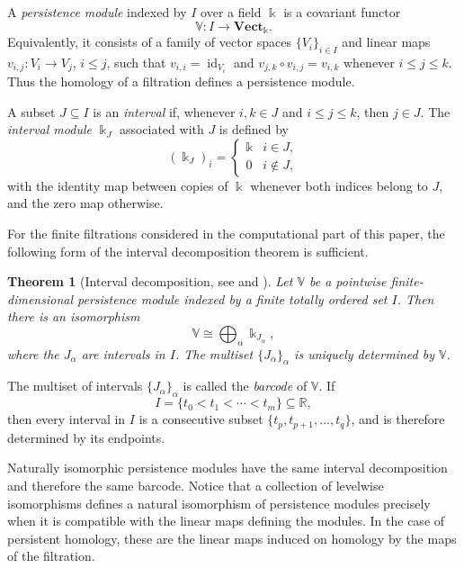 \documentclass[a4paper,11pt]{article}
\newtheorem{theorem}{Theorem}[section]
\theoremstyle{definition}
\theoremstyle{remark}
\DeclareMathOperator{\id}{id}
\begin{document}
A \emph{persistence module} indexed by $I$ over a field $\Bbbk$ is a covariant functor
$$ \mathbb{V}\colon I\longrightarrow \mathbf{Vect}_{\Bbbk}. $$
Equivalently, it consists of a family of vector spaces $\{V_i\}_{i\in I}$ and linear maps $v_{i,j}\colon V_i\longrightarrow V_j$, $i\leq j$, such that $v_{i,i}=\id_{V_i}$ and $v_{j,k}\circ v_{i,j}=v_{i,k}$ whenever $i\leq j\leq k$. Thus the homology of a filtration defines a persistence module.

A subset $J\subseteq I$ is an \emph{interval} if, whenever $i,k\in J$ and $i\leq j\leq k$, then $j\in J$. The \emph{interval module} $\Bbbk_J$ associated with $J$ is defined by
$$
(\Bbbk_J)_i=
\begin{cases}
\Bbbk & i\in J,\\
0 & i\notin J,
\end{cases}
$$
with the identity map between copies of $\Bbbk$ whenever both indices belong to $J$, and the zero map otherwise.

For the finite filtrations considered in the computational part of this paper, the following form of the interval decomposition theorem is sufficient.

\begin{theorem}[Interval decomposition, see {\cite{CSGO16}} and {\cite{Oud15}}]\label{thm:persistence-structure}
Let $\mathbb{V}$ be a pointwise finite-dimensional persistence module indexed by a finite totally ordered set $I$. Then there is an isomorphism
$$ \mathbb{V}\cong \bigoplus_{\alpha}\Bbbk_{J_\alpha}, $$
where the $J_\alpha$ are intervals in $I$. The multiset $\{J_\alpha\}_{\alpha}$ is uniquely determined by $\mathbb{V}$.
\end{theorem}

The multiset of intervals $\{J_\alpha\}_{\alpha}$ is called the \emph{barcode} of $\mathbb{V}$. If
$$ I=\{t_0<t_1<\cdots<t_m\}\subseteq \mathbb{R}, $$
then every interval in $I$ is a consecutive subset $\{t_p,t_{p+1},\ldots,t_q\}$, and is therefore determined by its endpoints.

Naturally isomorphic persistence modules have the same interval decomposition and therefore the same barcode. Notice that a collection of levelwise isomorphisms defines a natural isomorphism of persistence modules precisely when it is compatible with the linear maps defining the modules. In the case of persistent homology, these are the linear maps induced on homology by the maps of the filtration.

\end{document}
